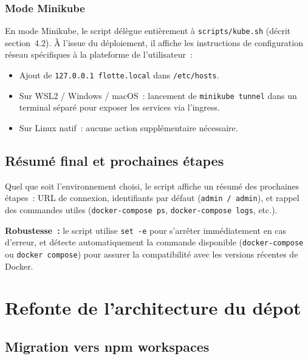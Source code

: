 \documentclass[12pt,a4paper]{article}
\begin{document}
\subsubsection{Mode Minikube}

En mode Minikube, le script d\'{e}l\`{e}gue enti\`{e}rement \`{a}
\texttt{scripts/kube.sh} (d\'{e}crit section~4.2). \`{A} l'issue du
d\'{e}ploiement, il affiche les instructions de configuration r\'{e}seau
sp\'{e}cifiques \`{a} la plateforme de l'utilisateur~:

\begin{itemize}[leftmargin=*]
  \item Ajout de \texttt{127.0.0.1 flotte.local} dans \texttt{/etc/hosts}.
  \item Sur WSL2 / Windows / macOS~: lancement de \texttt{minikube tunnel}
        dans un terminal s\'{e}par\'{e} pour exposer les services via l'ingress.
  \item Sur Linux natif~: aucune action suppl\'{e}mentaire n\'{e}cessaire.
\end{itemize}

\subsection{R\'{e}sum\'{e} final et prochaines \'{e}tapes}

Quel que soit l'environnement choisi, le script affiche un r\'{e}sum\'{e} des
prochaines \'{e}tapes~: URL de connexion, identifiants par d\'{e}faut
(\texttt{admin~/ admin}), et rappel des commandes utiles
(\texttt{docker-compose ps}, \texttt{docker-compose logs}, etc.).

\begin{infobox}
\textbf{Robustesse~:} le script utilise \texttt{set -e} pour s'arr\^{e}ter
imm\'{e}diatement en cas d'erreur, et d\'{e}tecte automatiquement la commande
disponible (\texttt{docker-compose} ou \texttt{docker compose}) pour assurer
la compatibilit\'{e} avec les versions r\'{e}centes de Docker.
\end{infobox}

\newpage
\section{Refonte de l'architecture du d\'{e}pot}

\subsection{Migration vers npm workspaces}
\end{document}
